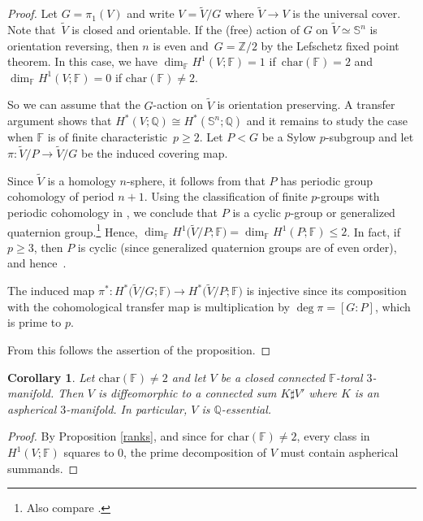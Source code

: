 \documentclass[pdftex]{sigma}
\numberwithin{equation}{section}
\newtheorem{Corollary}[Theorem]{Corollary}
\newcommand{\F}{\mathbb{F}}
\newcommand{\Z}{\mathbb{Z}}
\newcommand{\SSS}{\mathbb{S}}
\newcommand{\charac}{\mathrm{char}}
\begin{document}
\begin{proof} Let $G = \pi_1(V)$ and write $V = \tilde V / G$ where $\tilde V \to V$ is the universal cover.
Note that~$\tilde V$ is closed and orientable.
If the (free) action of $G$ on $\tilde V \simeq \SSS^n$ is orientation reversing, then $n$ is even and~${G = \Z/2}$ by the Lefschetz fixed point theorem.
In this case, we have $\dim_{\F} H^1(V ; \F) = 1$ if~${\charac(\F) = 2}$ and $\dim_{\F} H^1(V ; \F) = 0$ if $\charac(\F) \neq 2$.

So we can assume that the $G$-action on $\tilde V$ is orientation preserving.
A transfer argument shows that $H^*(V; \mathbb{Q}) \cong H^*(\SSS^n ; \mathbb{Q})$ and it remains to study the case when $\F$ is of finite characteristic~${p \geq 2}$.
Let $P < G$ be a Sylow $p$-subgroup and let $\pi \colon \tilde V / P \to \tilde V / G$ be the induced covering map.

Since $\tilde V$ is a homology $n$-sphere, it follows from \cite[Section XVI.9, Application 4]{C-E1956} that $P$ has periodic group cohomology of period $n+1$.
Using the classification of finite $p$-groups with periodic cohomology in \cite[Theorem XII.11.6]{C-E1956},
we conclude that $P$ is a cyclic $p$-group or generalized quaternion group.\footnote{Also compare \cite[Chapter IV.6]{Adem-Milgram}.}
Hence, $\dim_{\F} H^1\big(\tilde V / P; \F\big) = \dim_{\F} H^1(P ; \F) \leq 2$.
In fact, if~${p \geq 3}$, then $P$ is cyclic (since generalized quaternion groups are of even order), and hence~\smash{$\dim_{\F} H^1\big(\tilde V / P ; \F\big) \leq 1$}.

The induced map $\pi^* \colon H^*\big(\tilde V / G; \F\big) \to H^*\big(\tilde V / P ; \F\big)$ is injective since its composition with the cohomological transfer map \smash{$H^*\big(\tilde V / P; \F\big) \to H^*\big(\tilde V / G; \F\big)$} is multiplication by $\deg \pi = [G:P]$, which is prime to $p$.

From this follows the assertion of the proposition.
 \end{proof}

 \begin{Corollary} \label{cor:asphthree} Let $\charac(\F) \neq 2$ and let $V$ be a closed connected $\F$-toral $3$-manifold.
Then $V$ is diffeomorphic to a connected sum $K \sharp V'$ where $K$ is an aspherical $3$-manifold.
In particular, $V$ is $\mathbb{Q}$-essential.
\end{Corollary}

 \begin{proof}
By Proposition \ref{ranks}, and since for $\charac (\F) \neq 2$, every class in $H^1(V; \F)$ squares to $0$, the prime decomposition of $V$ must contain aspherical summands.
\end{proof}
\end{document}
